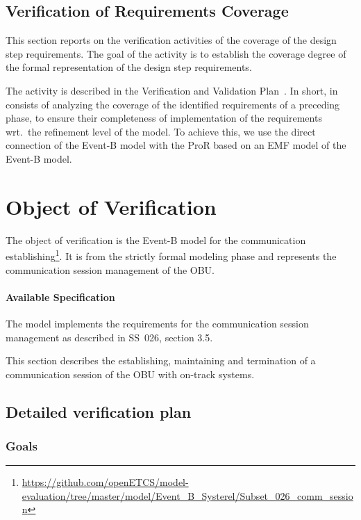 \documentclass{article}
\begin{document}
\subsection{Verification of Requirements Coverage}
\label{sec:verif-requ-cover}

This section reports on the verification activities of the coverage of the
design step requirements. The goal of the activity is to establish the coverage
degree of the formal representation of the design step requirements.

The activity is described in the Verification and Validation
Plan~\cite{vnvplan}.  In short, in consists of analyzing the coverage of the
identified requirements of a preceding phase, to ensure their completeness of
implementation of the requirements wrt.\ the refinement level of the model. To
achieve this, we use the direct connection of the Event-B model with the ProR
based on an EMF model of the Event-B model.


\section{Object of Verification}
\label{sec:object-verification}

The object of verification is the Event-B model for the communication
establishing\footnote{\url{https://github.com/openETCS/model-evaluation/tree/master/model/Event_B_Systerel/Subset_026_comm_session}}. It
is from the strictly formal modeling phase and represents the communication
session management of the OBU\@.

\paragraph{Available Specification}
\label{sec:avail-spec}

The model implements the requirements for the communication session management
as described in SS~026, section 3.5\cite{subset-26}.

This section describes the establishing, maintaining and termination of a
communication session of the OBU with on-track systems.

\subsection{Detailed verification plan}
\label{sec:deta-verif-plan}

\subsubsection{Goals}
\end{document}

